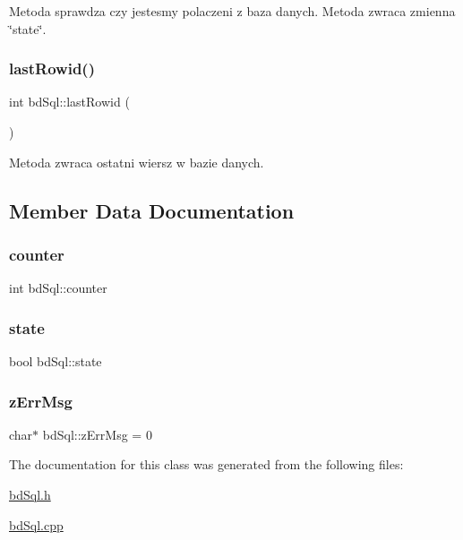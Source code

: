 Metoda sprawdza czy jestesmy polaczeni z baza danych. Metoda zwraca zmienna \char`\"{}state\char`\"{}. \mbox{\label{classbd_sql_a016360cb80604552be1cd1af1d210d7c}} 
\subsubsection{\texorpdfstring{last\+Rowid()}{lastRowid()}}
{\footnotesize\ttfamily int bd\+Sql\+::last\+Rowid (\begin{DoxyParamCaption}{ }\end{DoxyParamCaption})}



Metoda zwraca ostatni wiersz w bazie danych. 



\subsection{Member Data Documentation}
\mbox{\label{classbd_sql_a1c7d57e529b44058fda8f4bd2ad47d51}} 
\subsubsection{\texorpdfstring{counter}{counter}}
{\footnotesize\ttfamily int bd\+Sql\+::counter}

\mbox{\label{classbd_sql_ac232282cfe62fee6b794b9c76934d28e}} 
\subsubsection{\texorpdfstring{state}{state}}
{\footnotesize\ttfamily bool bd\+Sql\+::state}

\mbox{\label{classbd_sql_abaf69eb30f16320aa8d2f91d6aa43b7d}} 
\subsubsection{\texorpdfstring{z\+Err\+Msg}{zErrMsg}}
{\footnotesize\ttfamily char$\ast$ bd\+Sql\+::z\+Err\+Msg = 0}



The documentation for this class was generated from the following files\+:\begin{DoxyCompactItemize}
\item 
\mbox{\hyperlink{bd_sql_8h}{bd\+Sql.\+h}}\item 
\mbox{\hyperlink{bd_sql_8cpp}{bd\+Sql.\+cpp}}\end{DoxyCompactItemize}
